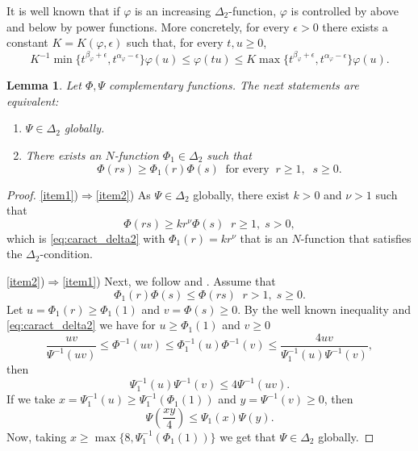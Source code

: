 \documentclass[twoside]{article}
\newtheorem{lem}[thm]{Lemma}
\theoremstyle{remark}
\renewcommand{\leq}{\leqslant}
\begin{document}
 It is well known   that if $\varphi$ is an increasing $\Delta_2$-function, $\varphi$ is controlled by above and below 
 by power functions.  More concretely, for every $\epsilon>0$ there exists a
constant $K=K(\varphi,\epsilon)$ such that, for every $t,u\geq 0$,
\begin{equation}\label{delta2-potencias}
    K^{-1}\min\big\{t^{\beta_{\varphi}+\epsilon},t^{\alpha_{\varphi}-\epsilon} \big\}\varphi(u)\leq \varphi(t u)\leq
    K\max\big\{t^{\beta_{\varphi}+\epsilon},t^{\alpha_{\varphi}-\epsilon} \big\}\varphi(u).
\end{equation}



\begin{lem}
Let $\Phi,\Psi$ complementary functions.
The next statements are equivalent:
\begin{enumerate}
\item\label{item1} $\Psi \in \Delta_2$ globally.
\item\label{item2} There exists an $N$-function $\Phi_1 \in \Delta_2$ such that
\begin{equation}\label{eq:caract_delta2}
\Phi(rs)\geq \Phi_1(r)\Phi(s)\;\;\mbox{for every}\;\;r\geq1,\;\;s\geq 0.
\end{equation}
\end{enumerate}
\end{lem}

\begin{proof}
\ref{item1})$\Rightarrow$\ref{item2}) As $\Psi \in  \Delta_2$ globally, there exist $k>0$ and $\nu>1$ such that
\[
\Phi(rs)\geq k r^\nu \Phi(s)\;\;r\geq 1,\;s>0,
\]
which is \eqref{eq:caract_delta2} with $\Phi_1(r)=kr^\nu$ that is an $N$-function that satisfies the $\Delta_2$-condition.

\ref{item2})$\Rightarrow$\ref{item1})
Next, we follow  \cite[p. 32, Prop. 13]{rao1991theory} and \cite[p. 29, Prop. 9]{rao1991theory}.
Assume that 
\[
\Phi_1(r)\Phi(s)\leq \Phi(rs)\;\;r>1,\;s\geq 0.
\]
Let $u=\Phi_1(r)\geq \Phi_1(1)$ and $v=\Phi(s)\geq 0$. By the well known inequality \cite[p. 13, Prop. 1]{rao1991theory} and \eqref{eq:caract_delta2} we have  for $u\geq \Phi_1(1)$ and $v\geq 0$
\[
\frac{uv}{\Psi^{-1}(uv)}\leq \Phi^{-1}(uv)\leq\Phi_1^{-1}(u)\Phi^{-1}(v)\leq
\frac{4uv}{\Psi_1^{-1}(u)\Psi^{-1}(v)},
\]
then 
\[
\Psi^{-1}_1(u)\Psi^{-1}(v)\leq 4 \Psi^{-1}(uv).
\]
If we take $x=\Psi^{-1}_1(u)\geq \Psi^{-1}_1(\Phi_1(1))$ and $y=\Psi^{-1}(v)\geq 0$, then 
\[
\Psi\left(\frac{xy}{4}\right)\leq \Psi_1(x)\Psi(y).
\]
Now, taking  $x\geq \max\{8,\Psi_1^{-1}(\Phi_1(1))\}$ we get that $\Psi \in \Delta_2$ globally.
\end{proof}
\end{document}
